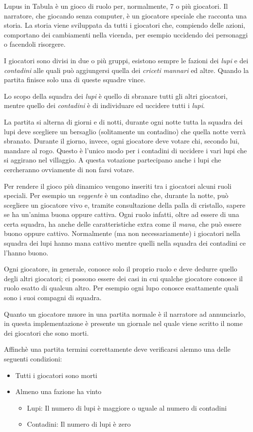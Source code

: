 Lupus in Tabula è un gioco di ruolo per, normalmente, 7 o più giocatori. Il narratore, che giocando senza computer, è un giocatore speciale che racconta una storia. La storia viene sviluppata da tutti i giocatori che, compiendo delle azioni, comportano dei cambiamenti nella vicenda, per esempio uccidendo dei personaggi o facendoli risorgere.

I giocatori sono divisi in due o più gruppi, esistono sempre le fazioni dei \emph{lupi} e dei \emph{contadini} alle quali può aggiungersi quella dei \emph{criceti mannari} ed altre. Quando la partita finisce solo una di queste squadre vince.

Lo scopo della squadra dei \emph{lupi} è quello di sbranare tutti gli altri giocatori, mentre quello dei \emph{contadini} è di individuare ed uccidere tutti i \emph{lupi}.

La partita si alterna di giorni e di notti, durante ogni notte tutta la squadra dei lupi deve scegliere un bersaglio (solitamente un contadino) che quella notte verrà sbranato. Durante il giorno, invece, ogni giocatore deve votare chi, secondo lui, mandare al rogo. Questo è l'unico modo per i contadini di uccidere i vari lupi che si aggirano nel villaggio. A questa votazione partecipano anche i lupi che cercheranno ovviamente di non farsi votare.

Per rendere il gioco più dinamico vengono inseriti tra i giocatori alcuni ruoli speciali. Per esempio un \emph{veggente} è un contadino che, durante la notte, può scegliere un giocatore vivo e, tramite consultazione della palla di cristallo, sapere se ha un'anima buona oppure cattiva. Ogni ruolo infatti, oltre ad essere di una certa squadra, ha anche delle caratteristiche extra come il \emph{mana}, che può essere buono oppure cattivo. Normalmente (ma non necessariamente) i giocatori nella squadra dei lupi hanno mana cattivo mentre quelli nella squadra dei contadini ce l'hanno buono.

Ogni giocatore, in generale, conosce solo il proprio ruolo e deve dedurre quello degli altri giocatori; ci possono essere dei casi in cui qualche giocatore conosce il ruolo esatto di qualcun altro. Per esempio ogni lupo conosce esattamente quali sono i suoi compagni di squadra.

Quanto un giocatore muore in una partita normale è il narratore ad annunciarlo, in questa implementazione è presente un giornale nel quale viene scritto il nome dei giocatori che sono morti.

Affinchè una partita termini correttamente deve verificarsi alemno una delle seguenti condizioni:

\begin{itemize}
	\item Tutti i giocatori sono morti
	\item Almeno una fazione ha vinto
	\begin{itemize}
		\item Lupi: Il numero di lupi è maggiore o uguale al numero di contadini
		\item Contadini: Il numero di lupi è zero
	\end{itemize}
\end{itemize}